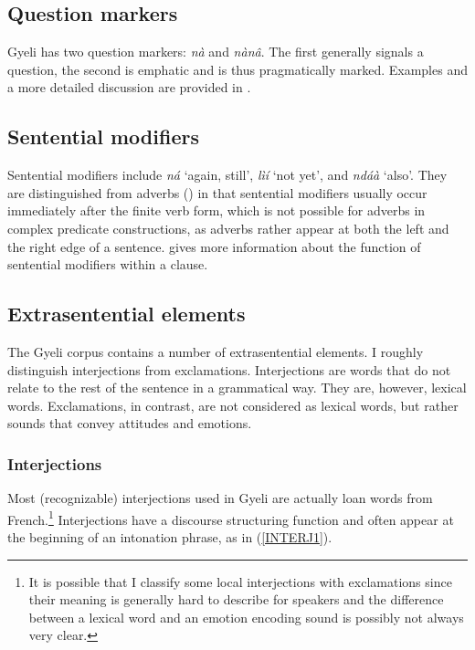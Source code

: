 \subsection{Question markers}
\label{sec:Qna}

Gyeli has two question markers: {\itshape nà} and {\itshape nànâ}. The first generally signals a question, the second is emphatic and is thus pragmatically marked. Examples and a more detailed discussion are provided in .


\subsection{Sentential modifiers}
\label{sec:SentMod}

Sentential modifiers include {\itshape ná} `again, still', {\itshape lìí} `not yet', and {\itshape ndáà} `also'. They are distinguished from adverbs () in that sentential modifiers usually occur immediately after the finite verb form, which is not possible for adverbs in complex predicate constructions, as adverbs rather appear at both the left and the right edge of a sentence.  gives more information about the function of sentential modifiers within a clause.


\subsection{Extrasentential elements}
\label{sec:Extrasent}

The Gyeli corpus contains a number of extrasentential elements. I roughly distinguish interjections from exclamations. Interjections are words that do not relate to the rest of the sentence in a grammatical way. They are, however, lexical words. Exclamations, in contrast, are not considered as lexical words, but rather sounds that convey attitudes and emotions.

\subsubsection{Interjections}
\label{sec:Interjections}

Most (recognizable) interjections used in Gyeli are actually loan words from French.\footnote{It is possible that I classify some local interjections with exclamations since their meaning is generally hard to describe for speakers and the difference between a lexical word and an emotion encoding sound is possibly not always very clear.} Interjections have a discourse structuring function and often appear at the beginning of an intonation phrase, as in (\ref{INTERJ1}).

